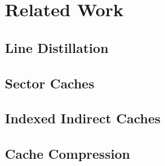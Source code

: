 \section{Related Work}
\subsection{Line Distillation}
\subsection{Sector Caches}
\subsection{Indexed Indirect Caches}
\subsection{Cache Compression}
